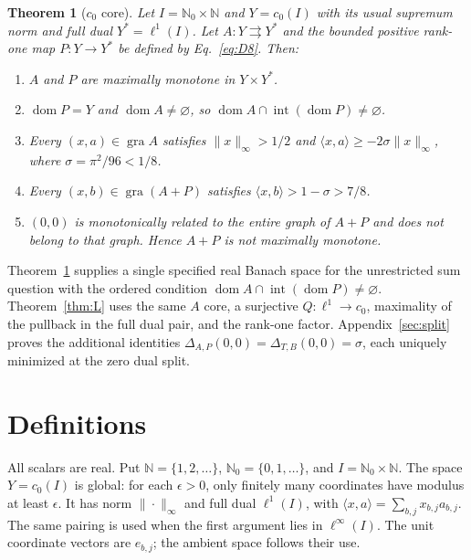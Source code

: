 \documentclass[11pt]{article}
\newcommand{\N}{\mathbb N}
\newcommand{\Nzero}{\mathbb N_0}
\newcommand{\gra}{\operatorname{gra}}
\newcommand{\dom}{\operatorname{dom}}
\newcommand{\pair}[2]{\langle #1,#2\rangle}
\newtheorem{theorem}{Theorem}
\begin{document}
\renewcommand{\thetheorem}{C}
\begin{theorem}[$c_0$ core]\label{thm:C}
Let $I=\Nzero\times\N$ and $Y=c_0(I)$ with its usual supremum norm and
full dual $Y^*=\ell^1(I)$. Let $A:Y\rightrightarrows Y^*$ and the bounded
positive rank-one map $P:Y\to Y^*$ be defined by Eq.~\eqref{eq:D8}.
Then:
\begin{enumerate}
\item $A$ and $P$ are maximally monotone in $Y\times Y^*$.
\item $\dom P=Y$ and $\dom A\ne\varnothing$, so
$\dom A\cap\operatorname{int}(\dom P)\ne\varnothing$.
\item Every $(x,a)\in\gra A$ satisfies $\|x\|_\infty>1/2$ and
$\pair{x}{a}\ge-2\sigma\|x\|_\infty$, where $\sigma=\pi^2/96<1/8$.
\item Every $(x,b)\in\gra(A+P)$ satisfies
$\pair{x}{b}>1-\sigma>7/8$.
\item $(0,0)$ is monotonically related to the entire graph of $A+P$ and
does not belong to that graph. Hence $A+P$ is not maximally monotone.
\end{enumerate}
\end{theorem}

\noindent Theorem~\ref{thm:C} supplies a single specified real Banach space
for the unrestricted sum question with the ordered condition
$\dom A\cap\operatorname{int}(\dom P)\ne\varnothing$.
Theorem~\ref{thm:L} uses the same $A$ core, a surjective
$Q:\ell^1\to c_0$, maximality of the pullback in the full dual pair, and
the rank-one factor. Appendix~\ref{sec:split} proves the additional
identities $\Delta_{A,P}(0,0)=\Delta_{T,B}(0,0)=\sigma$, each uniquely
minimized at the zero dual split.

\section{Definitions}
\label{sec:definitions}
All scalars are real. Put $\N=\{1,2,\ldots\}$, $\Nzero=\{0,1,\ldots\}$,
and $I=\Nzero\times\N$. The space $Y=c_0(I)$ is global: for each
$\epsilon>0$, only finitely many coordinates have modulus at least
$\epsilon$. It has norm $\|\cdot\|_\infty$ and full dual $\ell^1(I)$,
with $\pair{x}{a}=\sum_{b,j}x_{b,j}a_{b,j}$.
The same pairing is used when the first argument lies in $\ell^\infty(I)$.
The unit coordinate vectors are $e_{b,j}$; the ambient space follows their use.
\end{document}
